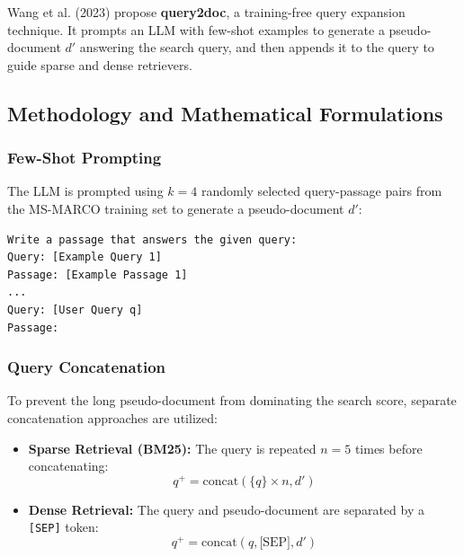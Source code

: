 \documentclass[11pt,a4paper]{article}
\begin{document}
Wang et al. (2023) propose \textbf{query2doc}, a training-free query expansion technique. It prompts an LLM with few-shot examples to generate a pseudo-document $d'$ answering the search query, and then appends it to the query to guide sparse and dense retrievers.

\subsection{Methodology and Mathematical Formulations}
\subsubsection{Few-Shot Prompting}
The LLM is prompted using $k=4$ randomly selected query-passage pairs from the MS-MARCO training set to generate a pseudo-document $d'$:
\begin{lstlisting}[language=bash]
Write a passage that answers the given query:
Query: [Example Query 1]
Passage: [Example Passage 1]
...
Query: [User Query q]
Passage:
\end{lstlisting}

\subsubsection{Query Concatenation}
To prevent the long pseudo-document from dominating the search score, separate concatenation approaches are utilized:
\begin{itemize}
    \item \textbf{Sparse Retrieval (BM25):} The query is repeated $n=5$ times before concatenating:
    \begin{equation}
    q^+ = \text{concat}(\{q\} \times n, d')
    \end{equation}
    \item \textbf{Dense Retrieval:} The query and pseudo-document are separated by a \texttt{[SEP]} token:
    \begin{equation}
    q^+ = \text{concat}(q, \text{[SEP]}, d')
    \end{equation}
\end{itemize}
\end{document}
